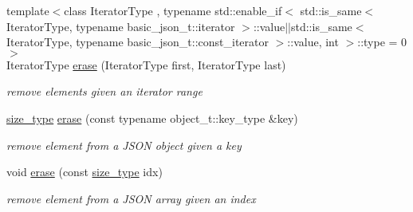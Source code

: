 \begin{DoxyCompactItemize}
{\footnotesize template$<$class Iterator\+Type , typename std\+::enable\+\_\+if$<$ std\+::is\+\_\+same$<$ Iterator\+Type, typename basic\+\_\+json\+\_\+t\+::iterator $>$\+::value$\vert$$\vert$std\+::is\+\_\+same$<$ Iterator\+Type, typename basic\+\_\+json\+\_\+t\+::const\+\_\+iterator $>$\+::value, int $>$\+::type  = 0$>$ }\\Iterator\+Type \hyperlink{classnlohmann_1_1basic__json_a8ac83750e267e37d5d47591eb44cce42}{erase} (Iterator\+Type first, Iterator\+Type last)
\begin{DoxyCompactList}\small\item\em remove elements given an iterator range \end{DoxyCompactList}\item 
\hyperlink{classnlohmann_1_1basic__json_a3ada29bca70b4965f6fd37ec1c8f85f7}{size\+\_\+type} \hyperlink{classnlohmann_1_1basic__json_af72b1c9d1502b02a49a0cb9db9f980ea}{erase} (const typename object\+\_\+t\+::key\+\_\+type \&key)
\begin{DoxyCompactList}\small\item\em remove element from a J\+S\+ON object given a key \end{DoxyCompactList}\item 
void \hyperlink{classnlohmann_1_1basic__json_a221b943d3228488c14225e55f726cc26}{erase} (const \hyperlink{classnlohmann_1_1basic__json_a3ada29bca70b4965f6fd37ec1c8f85f7}{size\+\_\+type} idx)
\begin{DoxyCompactList}\small\item\em remove element from a J\+S\+ON array given an index \end{DoxyCompactList}\end{DoxyCompactItemize}
